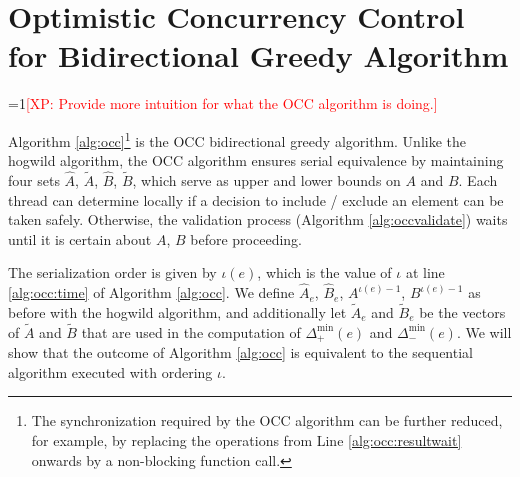 \documentclass{article} %
\newcommand{\Comments}{1}
\newcommand{\note}[2]{\ifnum\Comments=1\textcolor{#1}{#2}\fi}
\newcommand{\xinghao}[1]{\note{red}{[XP: #1]}}
\begin{document}
\section{Optimistic Concurrency Control for Bidirectional Greedy Algorithm}
\xinghao{Provide more intuition for what the OCC algorithm is doing.}

Algorithm \ref{alg:occ}\footnote{The synchronization required by the OCC algorithm can be further reduced, for example, by replacing the operations from Line \ref{alg:occ:resultwait} onwards by a non-blocking function call.} is the OCC bidirectional greedy algorithm.
Unlike the hogwild algorithm, the OCC algorithm ensures serial equivalence by maintaining four sets $\hat{A}$, $\tilde{A}$, $\hat{B}$, $\tilde{B}$, which serve as upper and lower bounds on $A$ and $B$.
Each thread can determine locally if a decision to include / exclude an element can be taken safely.
Otherwise, the validation process (Algorithm \ref{alg:occvalidate}) waits until it is certain about $A$, $B$ before proceeding.

The serialization order is given by $\iota(e)$, which is the value of $\iota$ at line \ref{alg:occ:time} of Algorithm \ref{alg:occ}.
We define $\hat{A}_e$, $\hat{B}_e$, $A^{\iota(e)-1}$, $B^{\iota(e)-1}$ as before with the hogwild algorithm, and additionally let $\tilde{A}_e$ and $\tilde{B}_e$ be the vectors of $\tilde{A}$ and $\tilde{B}$ that are used in the computation of $\Delta_+^{\min}(e)$ and $\Delta_-^{\min}(e)$.
We will show that the outcome of Algorithm \ref{alg:occ} is equivalent to the sequential algorithm executed with ordering $\iota$.
\end{document}
